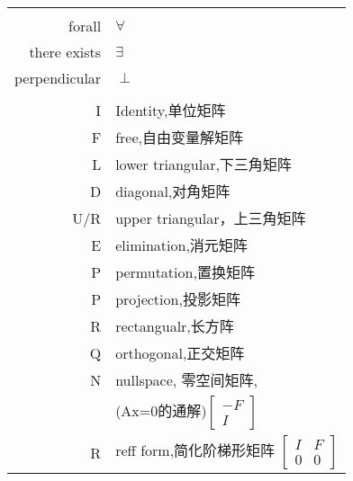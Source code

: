 \documentclass[UTF8,9pt]{ctexart}
\begin{document}
\begin{center}
\begin{supertabular}{rl}
		&\\

		forall&$\forall$\\
		there exists&$\exists$\\
		perpendicular&$\perp$\\
		&\\
		I&Identity,单位矩阵\\
		F&free,自由变量解矩阵\\
		L&lower triangular,下三角矩阵\\
		D&diagonal,对角矩阵\\
		U/R&upper triangular，上三角矩阵\\
		E&elimination,消元矩阵\\
		P&permutation,置换矩阵\\
		P&projection,投影矩阵\\
		R&rectangualr,长方阵\\
		Q&orthogonal,正交矩阵\\
		N&nullspace, 零空间矩阵,\\
		&(Ax=0的通解)$\begin{bmatrix}
				-F \\
				I
			\end{bmatrix}$\\
		R&reff form,简化阶梯形矩阵 $\begin{bmatrix}
				I & F \\
				0 & 0
			\end{bmatrix}$\\
	\end{supertabular}
\end{center}
\end{document}
